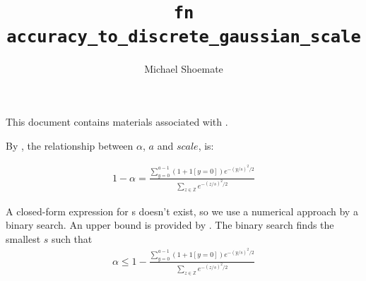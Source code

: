 \documentclass{article}
\title{\texttt{fn accuracy\_to\_discrete\_gaussian\_scale}}
\author{Michael Shoemate}
\begin{document}
\maketitle

This document contains materials associated with .

By , 
the relationship between $\alpha$, $a$ and $scale$, is:

\begin{align*}
    1 - \alpha = \frac{\sum_{y=0}^{a - 1} (1 + 1[y = 0]) e^{-(y/s)^2/2}}{\sum_{z \in \mathbb{Z}} e^{-(z/s)^2/2}}
\end{align*}

A closed-form expression for s doesn't exist, 
so we use a numerical approach by a binary search.
An upper bound is provided by .
The binary search finds the smallest $s$ such that
\begin{align*}
    \alpha \le 1 - \frac{\sum_{y=0}^{a - 1} (1 + 1[y = 0]) e^{-(y/s)^2/2}}{\sum_{z \in \mathbb{Z}} e^{-(z/s)^2/2}}
\end{align*}
\end{document}
